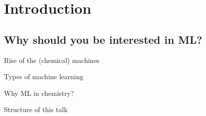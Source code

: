 \section{Introduction}
\subsection{Why should you be interested in ML?}
\begin{frame}[t]{Rise of the (chemical) machines}

\end{frame}

\begin{frame}[t]{Types of machine learning}

\end{frame}
\begin{frame}[t]{Why ML in chemistry?}

\end{frame}

\begin{frame}[t]{Structure of this talk}

\end{frame}